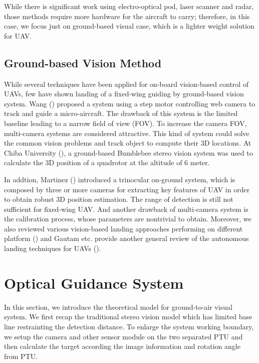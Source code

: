 While there is significant work using electro-optical pod, laser scanner and radar, those methods require more hardware for the aircraft to carry; therefore, in this case, we focus just on ground-based visual case, which is a lighter weight solution for UAV.
\subsection{Ground-based Vision Method}
While several techniques have been applied for on-board vision-based control of UAVs, few have shown landing of a fixed-wing guiding by ground-based vision system. Wang (\cite{Wang2006}) proposed a system using a step motor controlling web camera to track and guide a micro-aircraft. The drawback of this system is the limited baseline leading to a narrow field of view (FOV). To increase the camera FOV, multi-camera systems are considered attractive. This kind of system could solve the common vision problems and track object to compute their 3D locations. At Chiba University (\cite{pebrianti2010autonomous}), a ground-based Bumblebee stereo vision system was used to calculate the 3D position of a quadrotor at the altitude of 6 meter. 

In addtion, Martinez (\cite{Martinez2009a}) introduced a trinocular on-ground system, which is composed by three or more cameras for extracting key features of UAV in order to obtain robust 3D position estimation. The range of detection is still not sufficient for fixed-wing UAV. And another drawback of multi-camera system is the calibration process, whose parameters are nontrivial to obtain. Moreover, we also reviewed various vision-based landing approaches performing on different platform (\cite{kong2014vision}) and Gautam etc. provide another general review of the autonomous landing techniques for UAVs (\cite{Gautam2014}).


\section{Optical Guidance System}
In this section, we introduce the theoretical model for ground-to-air visual system. We first recap the traditional stereo vision model which has limited base line restrainting the detection distance. To enlarge the system working boundary, we setup the camera and other sensor module on the two separated PTU and then calculate the target according the image information and rotation angle from PTU.

